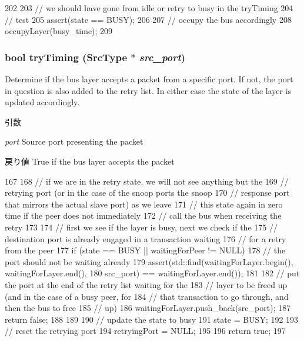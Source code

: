\begin{DoxyCode}
202 {
203     // we should have gone from idle or retry to busy in the tryTiming
204     // test
205     assert(state == BUSY);
206 
207     // occupy the bus accordingly
208     occupyLayer(busy_time);
209 }
\end{DoxyCode}
\hypertarget{classBaseBus_1_1Layer_a903a48e7e621bc5add3149fdce906bc7}{
\subsubsection[{tryTiming}]{\setlength{\rightskip}{0pt plus 5cm}bool tryTiming (SrcType $\ast$ {\em src\_\-port})}}
\label{classBaseBus_1_1Layer_a903a48e7e621bc5add3149fdce906bc7}
Determine if the bus layer accepts a packet from a specific port. If not, the port in question is also added to the retry list. In either case the state of the layer is updated accordingly.


\begin{DoxyParams}{引数}
\item[{\em port}]Source port presenting the packet\end{DoxyParams}
\begin{DoxyReturn}{戻り値}
True if the bus layer accepts the packet 
\end{DoxyReturn}



\begin{DoxyCode}
167 {
168     // if we are in the retry state, we will not see anything but the
169     // retrying port (or in the case of the snoop ports the snoop
170     // response port that mirrors the actual slave port) as we leave
171     // this state again in zero time if the peer does not immediately
172     // call the bus when receiving the retry
173 
174     // first we see if the layer is busy, next we check if the
175     // destination port is already engaged in a transaction waiting
176     // for a retry from the peer
177     if (state == BUSY || waitingForPeer != NULL) {
178         // the port should not be waiting already
179         assert(std::find(waitingForLayer.begin(), waitingForLayer.end(),
180                          src_port) == waitingForLayer.end());
181 
182         // put the port at the end of the retry list waiting for the
183         // layer to be freed up (and in the case of a busy peer, for
184         // that transaction to go through, and then the bus to free
185         // up)
186         waitingForLayer.push_back(src_port);
187         return false;
188     }
189 
190     // update the state to busy
191     state = BUSY;
192 
193     // reset the retrying port
194     retryingPort = NULL;
195 
196     return true;
197 }
\end{DoxyCode}


